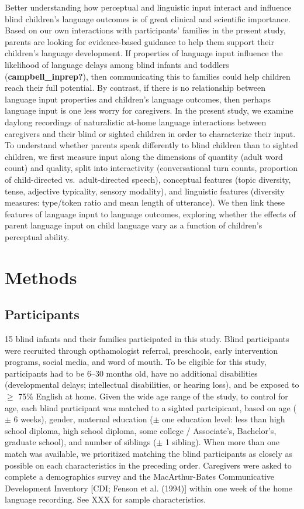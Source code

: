 \documentclass[
  man]{apa6}
\begin{document}
Better understanding how perceptual and linguistic input interact and influence blind children's language outcomes is of great clinical and scientific importance. Based on our own interactions with participants' families in the present study, parents are looking for evidence-based guidance to help them support their children's language development. If properties of language input influence the likelihood of language delays among blind infants and toddlers (\textbf{campbell\_inprep?}), then communicating this to families could help children reach their full potential. By contrast, if there is no relationship between language input properties and children's language outcomes, then perhaps language input is one less worry for caregivers. In the present study, we examine daylong recordings of naturalistic at-home language interactions between caregivers and their blind or sighted children in order to characterize their input. To understand whether parents speak differently to blind children than to sighted children, we first measure input along the dimensions of quantity (adult word count) and quality, split into interactivity (conversational turn counts, proportion of child-directed vs.~adult-directed speech), conceptual features (topic diversity, tense, adjective typicality, sensory modality), and linguistic features (diversity measures: type/token ratio and mean length of utterance). We then link these features of language input to language outcomes, exploring whether the effects of parent language input on child language vary as a function of children's perceptual ability.

\hypertarget{methods}{%
\section{Methods}\label{methods}}

\hypertarget{participants}{%
\subsection{Participants}\label{participants}}

15 blind infants and their families participated in this study. Blind participants were recruited through opthamologist referral, preschools, early intervention programs, social media, and word of mouth. To be eligible for this study, participants had to be 6--30 months old, have no additional disabilities (developmental delays; intellectual disabilities, or hearing loss), and be exposed to \(\geq\) 75\% English at home. Given the wide age range of the study, to control for age, each blind participant was matched to a sighted partcipicant, based on age (\(\pm\) 6 weeks), gender, maternal education (\(\pm\) one education level: less than high school diploma, high school diploma, some college / Associate's, Bachelor's, graduate school), and number of siblings (\(\pm\) 1 sibling). When more than one match was available, we prioritized matching the blind participants as closely as possible on each characteristics in the preceding order. Caregivers were asked to complete a demographics survey and the MacArthur-Bates Communicative Development Inventory {[}CDI; Fenson et al. (1994){]} within one week of the home language recording. See XXX for sample characteristics.
\end{document}
